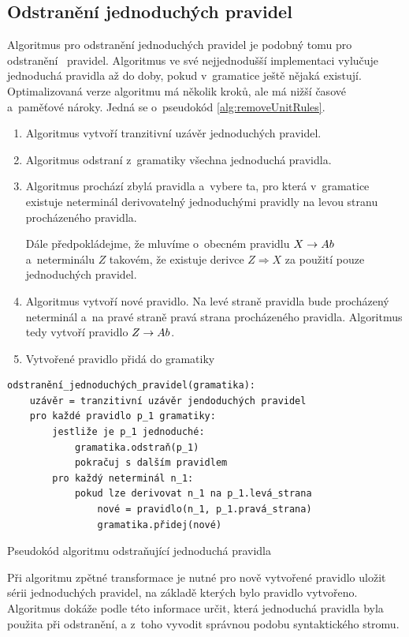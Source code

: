 	\subsection{Odstranění jednoduchých pravidel}
	
	Algoritmus pro odstranění jednoduchých pravidel je podobný tomu pro odstranění \Eps~pravidel. Algoritmus ve své nejjednodušší implementaci vylučuje jednoduchá pravidla až do doby, pokud v~gramatice ještě nějaká existují. Optimalizovaná verze algoritmu má několik kroků, ale má nižší časové a~paměťové nároky. Jedná se o~pseudokód \ref{alg:removeUnitRules}.
	
	\begin{enumerate}
		\item
		Algoritmus vytvoří tranzitivní uzávěr jednoduchých pravidel.
		\item
		Algoritmus odstraní z~gramatiky všechna jednoduchá pravidla.
		\item
		Algoritmus prochází zbylá pravidla a~vybere ta, pro která v~gramatice existuje neterminál derivovatelný jednoduchými pravidly na levou stranu procházeného pravidla.\par
		Dále předpokládejme, že mluvíme o~obecném pravidlu ${X} \allowbreak\rightarrow\allowbreak {Ab}$ a~neterminálu $Z$ takovém, že existuje derivce $Z \Rightarrow X$ za použití pouze jednoduchých pravidel.
		\item
		Algoritmus vytvoří nové pravidlo. Na levé straně pravidla bude procházený neterminál a~na pravé straně pravá strana procházeného pravidla. Algoritmus tedy vytvoří pravidlo ${Z} \allowbreak\rightarrow\allowbreak {Ab}$.
		\item
		Vytvořené pravidlo přidá do gramatiky
	\end{enumerate}
	
	\begin{listing}
		\begin{verbatim}
odstranění_jednoduchých_pravidel(gramatika):
	uzávěr = tranzitivní uzávěr jendoduchých pravidel
	pro každé pravidlo p_1 gramatiky:
		jestliže je p_1 jednoduché:
			gramatika.odstraň(p_1)
			pokračuj s dalším pravidlem
		pro každý neterminál n_1:
			pokud lze derivovat n_1 na p_1.levá_strana
				nové = pravidlo(n_1, p_1.pravá_strana)
				gramatika.přidej(nové)
		\end{verbatim}
		\caption{Pseudokód algoritmu odstraňující jednoduchá pravidla}
		\label{alg:removeUnitRules}
	\end{listing}
	
	Při algoritmu zpětné transformace je nutné pro nově vytvořené pravidlo uložit sérii jednoduchých pravidel, na základě kterých bylo pravidlo vytvořeno. Algoritmus dokáže podle této informace určit, která jednoduchá pravidla byla použita při odstranění, a z~toho vyvodit správnou podobu syntaktického stromu.
	
